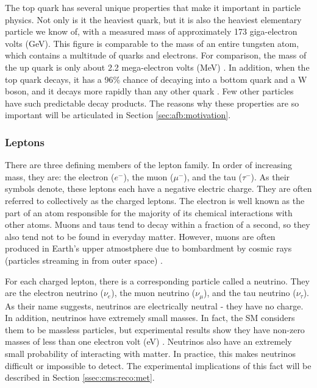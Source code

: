 The top quark has several unique properties that make it important
in particle physics. Not only is
it the heaviest quark, but it is also the heaviest elementary particle
we know of, with a measured mass of approximately 173 giga-electron
volts (GeV). This figure is comparable to the mass
of an entire tungsten atom, which contains a multitude of quarks and
electrons. For comparison, the mass of the up quark is only about
2.2 mega-electron volts (MeV) \cite{pdg}.
In addition, when the top quark decays, it has a 96\% chance of
decaying into a bottom quark and a W boson, and it decays
more rapidly than any other quark \cite{pdg}. Few other
particles have such predictable decay products. The reasons why these
properties are so important will be articulated in Section \ref{sec:afb:motivation}.

\subsubsection*{Leptons}
There are three defining members of the lepton family. In order of
increasing mass, they are: the electron
($e^-$), the muon ($\mu^-$), and the tau ($\tau^-$). As their symbols
denote, these leptons each have a negative electric charge. They are
often referred to collectively as the charged leptons.
The electron is well known as the part of an atom responsible for the
majority of its chemical interactions with other atoms. Muons and taus
tend to decay within a fraction of a second, so they also tend not to
be found in everyday matter. However, muons are often produced in
Earth's upper atmostphere due to bombardment by cosmic rays (particles
streaming in from outer space) \cite{griffiths}.

For each charged lepton, there is a corresponding particle called a
neutrino. They are the electron neutrino ($\nu_e$), the muon
neutrino ($\nu_{\mu}$), and the tau neutrino ($\nu_{\tau}$). As their
name suggests, neutrinos are electrically neutral - they have no
charge. In addition, neutrinos have extremely small masses. In fact,
the SM considers them to be massless particles, but experimental
results show they have non-zero masses of less than one electron volt
(eV) \cite{pdg}. Neutrinos also have an extremely small probability of
interacting with matter. In practice, this makes neutrinos
difficult or impossible to detect. The experimental implications of
this fact will be described in Section \ref{ssec:cms:reco:met}.

